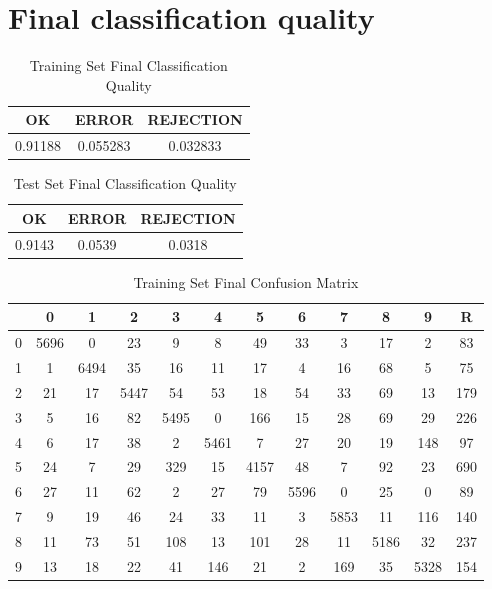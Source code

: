 \documentclass[a4paper, 11pt, wide]{article}
\begin{document}
  \section{Final classification quality}
  \begin{table}[H]
  \begin{center}
  \begin{tabular}{ |c|c|c| } 
  \hline
  OK & ERROR & REJECTION \\ 
  \hline
  0.91188 & 0.055283 & 0.032833 \\
  \hline
  \end{tabular}
  \end{center}
  \caption{Training Set Final Classification Quality}
  \end{table}
  \begin{table}[H]
  \begin{center}
  \begin{tabular}{ |c|c|c| } 
  \hline
  OK & ERROR & REJECTION \\ 
  \hline
  0.9143 & 0.0539 & 0.0318 \\
  \hline
  \end{tabular}
  \caption{Test Set Final Classification Quality}
  \end{center}
  \end{table}
    \begin{table}[H]
  \begin{center}
  \begin{tabular}{ |c|c c c c c c c c c c|c| } 
  \hline
   & 0 & 1 & 2 & 3 & 4 & 5 & 6 & 7 & 8 & 9 & R\\ 
  \hline
	 0 & 5696 & 0 & 23 & 9 & 8 & 49 & 33 & 3 & 17 & 2 & 83 \\
	 1 & 1 & 6494 & 35 & 16 & 11 & 17 & 4 & 16 & 68 & 5 & 75 \\
	 2 & 21 & 17 & 5447 & 54 & 53 & 18 & 54 & 33 & 69 & 13 & 179 \\
	 3 & 5 & 16 & 82 & 5495 & 0 & 166 & 15 & 28 & 69 & 29 & 226 \\
	 4 & 6 & 17 & 38 & 2 & 5461 & 7 & 27 & 20 & 19 & 148 & 97 \\
	 5 & 24 & 7 & 29 & 329 & 15 & 4157 & 48 & 7 & 92 & 23 & 690 \\
	 6 & 27 & 11 & 62 & 2 & 27 & 79 & 5596 & 0 & 25 & 0 & 89 \\
	 7 & 9 & 19 & 46 & 24 & 33 & 11 & 3 & 5853 & 11 & 116 & 140 \\
	 8 & 11 & 73 & 51 & 108 & 13 & 101 & 28 & 11 & 5186 & 32 & 237 \\
	 9 & 13 & 18 & 22 & 41 & 146 & 21 & 2 & 169 & 35 & 5328 & 154 \\
   \hline
  \end{tabular}
  \end{center}
  \caption{Training Set Final Confusion Matrix}
  \end{table}
\end{document}
